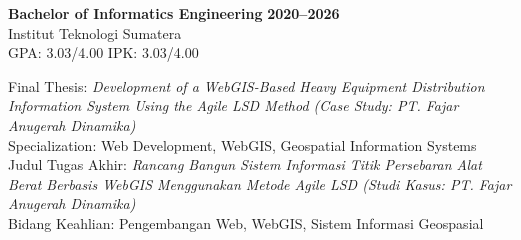 

\textbf{Bachelor of Informatics Engineering} \hfill \textbf{2020--2026} \\
Institut Teknologi Sumatera \\
\ifenglish GPA: 3.03/4.00 \else IPK: 3.03/4.00 \fi

\vspace{2pt}

\ifenglish
Final Thesis: \textit{Development of a WebGIS-Based Heavy Equipment Distribution Information System Using the Agile LSD Method (Case Study: PT. Fajar Anugerah Dinamika)} \\
Specialization: Web Development, WebGIS, Geospatial Information Systems
\else
Judul Tugas Akhir: \textit{Rancang Bangun Sistem Informasi Titik Persebaran Alat Berat Berbasis WebGIS Menggunakan Metode Agile LSD (Studi Kasus: PT. Fajar Anugerah Dinamika)} \\
Bidang Keahlian: Pengembangan Web, WebGIS, Sistem Informasi Geospasial
\fi